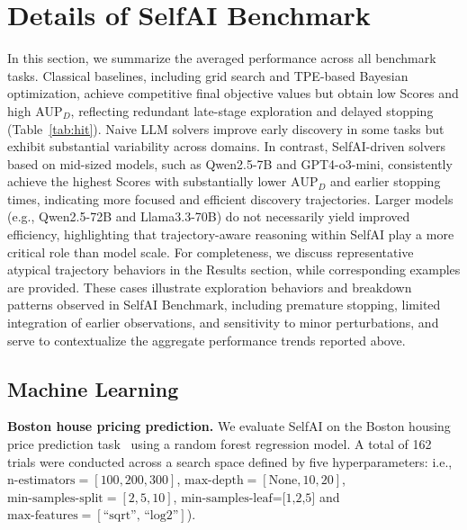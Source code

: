 \section{Details of SelfAI Benchmark}
\label{sec:supp_details_benchmark}
In this section, we summarize the averaged performance across all benchmark tasks. Classical baselines, including grid search and TPE-based Bayesian optimization, achieve competitive final objective values but obtain low Scores and high $\text{AUP}_D$, reflecting redundant late-stage exploration and delayed stopping (Table~\ref{tab:hit}). Naive LLM solvers improve early discovery in some tasks but exhibit substantial variability across domains. In contrast, SelfAI-driven solvers based on mid-sized models, such as Qwen2.5-7B and GPT4-o3-mini, consistently achieve the highest Scores with substantially lower $\text{AUP}_D$ and earlier stopping times, indicating more focused and efficient discovery trajectories. Larger models (e.g., Qwen2.5-72B and Llama3.3-70B) do not necessarily yield improved efficiency, highlighting that trajectory-aware reasoning within SelfAI play a more critical role than model scale. For completeness, we discuss representative atypical trajectory behaviors in the Results section, while corresponding examples are provided. These cases illustrate exploration behaviors and breakdown patterns observed in SelfAI Benchmark, including premature stopping, limited integration of earlier observations, and sensitivity to minor perturbations, and serve to contextualize the aggregate performance trends reported above.

\subsection{Machine Learning}
{\bf Boston house pricing prediction.} We evaluate SelfAI on the Boston housing price prediction task~\cite{boston} using a random forest regression model. A total of 162 trials were conducted across a search space defined by five hyperparameters: i.e., $\text{n-estimators}=[100, 200, 300]$, $\text{max-depth} = [\text{None}, 10, 20]$, $\text{min-samples-split}=[2, 5, 10]$, $\text{min-samples-leaf=[1,2,5]}$ and $\text{max-features}=[\text{``sqrt'', ``log2''}]$). 


